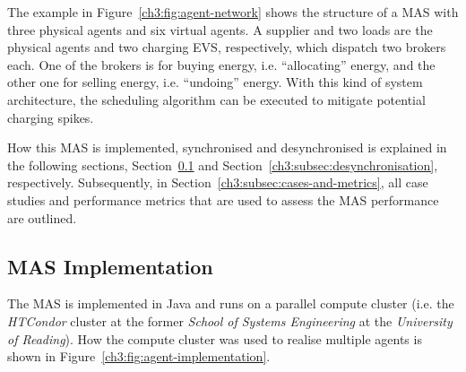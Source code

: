 

The example in Figure~\ref{ch3:fig:agent-network} shows the structure of a MAS with three physical agents and six virtual agents.
A supplier and two loads are the physical agents and two charging EVS, respectively, which dispatch two brokers each.
One of the brokers is for buying energy, i.e. ``allocating'' energy, and the other one for selling energy, i.e. ``undoing'' energy.
With this kind of system architecture, the scheduling algorithm can be executed to mitigate potential charging spikes.

How this MAS is implemented, synchronised and desynchronised is explained in the following sections, Section~\ref{ch3:subsec:implementation} and Section~\ref{ch3:subsec:desynchronisation}, respectively.
Subsequently, in Section~\ref{ch3:subsec:cases-and-metrics}, all case studies and performance metrics that are used to assess the MAS performance are outlined.

\subsection{MAS Implementation}
\label{ch3:subsec:implementation}

The MAS is implemented in Java and runs on a parallel compute cluster (i.e. the \textit{HTCondor} cluster at the former \textit{School of Systems Engineering} at the \textit{University of Reading}).
How the compute cluster was used to realise multiple agents is shown in Figure~\ref{ch3:fig:agent-implementation}.



